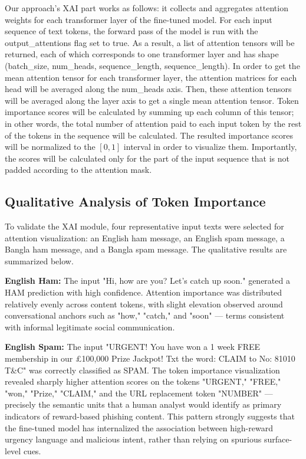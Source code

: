 \documentclass[journal]{IEEEtran}
\begin{document}
Our approach's XAI part works as follows: it collects and aggregates attention weights for each transformer layer of the fine-tuned model. For each input sequence of text tokens, the forward pass of the model is run with the output\_attentions flag set to true. As a result, a list of attention tensors will be returned, each of which corresponds to one transformer layer and has shape (batch\_size, num\_heads, sequence\_length, sequence\_length). In order to get the mean attention tensor for each transformer layer, the attention matrices for each head will be averaged along the num\_heads axis. Then, these attention tensors will be averaged along the layer axis to get a single mean attention tensor. Token importance scores will be calculated by summing up each column of this tensor; in other words, the total number of attention paid to each input token by the rest of the tokens in the sequence will be calculated. The resulted importance scores will be normalized to the $[0, 1]$ interval in order to visualize them. Importantly, the scores will be calculated only for the part of the input sequence that is not padded according to the attention mask.

\subsection{Qualitative Analysis of Token Importance}

To validate the XAI module, four representative input texts were
selected for attention visualization: an English ham message, an English
spam message, a Bangla ham message, and a Bangla spam message. The
qualitative results are summarized below.

\textbf{English Ham:} The input "Hi, how are you? Let's catch up soon."
generated a HAM prediction with high confidence. Attention importance
was distributed relatively evenly across content tokens, with slight
elevation observed around conversational anchors such as "how," "catch,"
and "soon" --- terms consistent with informal legitimate social
communication.

\textbf{English Spam:} The input "URGENT! You have won a 1 week FREE
membership in our \pounds 100,000 Prize Jackpot! Txt the word: CLAIM to No:
81010 T\&C" was correctly classified as SPAM. The token importance
visualization revealed sharply higher attention scores on the tokens
"URGENT," "FREE," "won," "Prize," "CLAIM," and the URL replacement token
"NUMBER" --- precisely the semantic units that a human analyst would
identify as primary indicators of reward-based phishing content. This
pattern strongly suggests that the fine-tuned model has internalized the
association between high-reward urgency language and malicious intent,
rather than relying on spurious surface-level cues.
\end{document}
